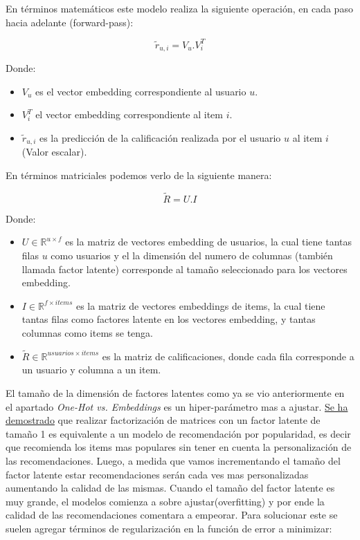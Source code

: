 \documentclass[11pt,a4paper,twoside]{thesis}
\begin{document}
En términos matemáticos este modelo realiza la siguiente operación, en cada paso hacia adelante (forward-pass):

\begin{equation*}
	\tilde{r}_{u, i} = V_u . V_i^{T}
\end{equation*}
\begin{description}
	\item[Donde:]
\end{description}
\begin{itemize}
	\item $V_u$ es el vector embedding correspondiente al usuario $u$.
	\item $V_i^{T}$ el vector embedding correspondiente al item $i$.
	\item $ \tilde{r}_{u, i}$ es la predicción de la calificación realizada por el usuario $u$ al item $i$ (Valor escalar).
\end{itemize}

En términos matriciales podemos verlo de la siguiente manera:

\begin{equation*}
	\tilde{R} = U.I
\end{equation*}
\begin{description}
	\item[Donde:]
\end{description}
\begin{itemize}
	\item $U\in\mathbb{R}^{u \times f}$ es la matriz de vectores embedding de usuarios, la cual tiene tantas filas $u$ como usuarios y el la dimensión del numero de columnas (también llamada factor latente) corresponde al tamaño seleccionado para los vectores embedding. 
	\item $I\in\mathbb{R}^{f\times items}$ es la matriz de vectores embeddings de items, la cual tiene tantas filas como factores latente en los vectores embedding, y tantas columnas como items se tenga. 
	\item $\tilde{R}\in\mathbb{R}^{usuarios \times items}$ es la matriz de calificaciones, donde cada fila corresponde a un usuario y columna a un item.
\end{itemize}


El tamaño de la dimensión de factores latentes como ya se vio anteriormente en el apartado \textit{One-Hot vs. Embeddings} es un hiper-parámetro mas a ajustar. \href{https://link.springer.com/chapter/10.1007/978-3-642-38844-6_3}{Se ha demostrado} que realizar factorización de matrices con un factor latente de tamaño 1 es equivalente a un modelo de recomendación por popularidad, es decir que recomienda los items mas populares sin tener en cuenta la personalización de las recomendaciones. Luego, a medida que vamos incrementando el tamaño del factor latente estar recomendaciones serán cada ves mas personalizadas aumentando la calidad de las mismas. Cuando el tamaño del factor latente es muy grande, el modelos comienza a sobre ajustar(overfitting) y por ende la calidad de las recomendaciones comentara a empeorar. Para solucionar este se suelen agregar términos de regularización en la función de error a minimizar:
\end{document}
